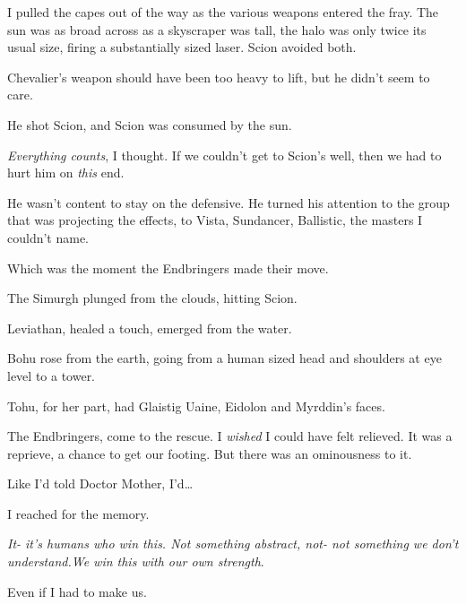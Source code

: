 I pulled the capes out of the way as the various weapons entered the fray.  The sun was as broad across as a skyscraper was tall, the halo was only twice its usual size, firing a substantially sized laser.  Scion avoided both.



Chevalier's weapon should have been too heavy to lift, but he didn't seem to care.



He shot Scion, and Scion was consumed by the sun.



\emph{Everything counts}, I thought.  If we couldn't get to Scion's well, then we had to hurt him on \emph{this} end.



He wasn't content to stay on the defensive.  He turned his attention to the group that was projecting the effects, to Vista, Sundancer, Ballistic, the masters I couldn't name.



Which was the moment the Endbringers made their move.



The Simurgh plunged from the clouds, hitting Scion.



Leviathan, healed a touch, emerged from the water.



Bohu rose from the earth, going from a human sized head and shoulders at eye level to a tower.



Tohu, for her part, had Glaistig Uaine, Eidolon and\emph{ }Myrddin's faces.



The Endbringers, come to the rescue.  I \emph{wished} I could have felt relieved.  It was a reprieve, a chance to get our footing.  But there was an ominousness to it.



Like I'd told Doctor Mother, I'd\ldots



I reached for the memory.



\emph{It- it's humans who win this.  Not something abstract, not- not something we don't understand.}\emph{We win this with our own strength}.



Even if I had to make us.



